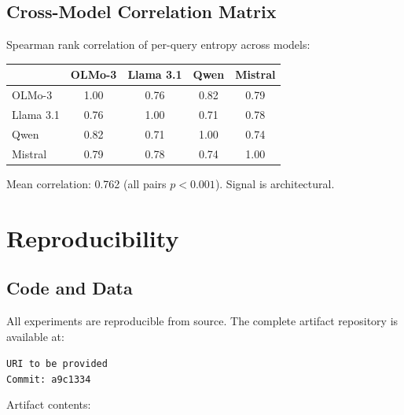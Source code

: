 \documentclass[12pt]{article}
\begin{document}
\subsection{Cross-Model Correlation Matrix}

Spearman rank correlation of per-query entropy across models:

\begin{table}[H]
\centering
\begin{tabular}{lcccc}
\toprule
& OLMo-3 & Llama 3.1 & Qwen & Mistral \\
\midrule
OLMo-3 & 1.00 & 0.76 & 0.82 & 0.79 \\
Llama 3.1 & 0.76 & 1.00 & 0.71 & 0.78 \\
Qwen & 0.82 & 0.71 & 1.00 & 0.74 \\
Mistral & 0.79 & 0.78 & 0.74 & 1.00 \\
\bottomrule
\end{tabular}
\end{table}

Mean correlation: 0.762 (all pairs $p < 0.001$). Signal is architectural.


\section{Reproducibility}

\subsection{Code and Data}

All experiments are reproducible from source. The complete artifact repository is available at:

\begin{center}
\texttt{URI to be provided}\\
\texttt{Commit: a9c1334}
\end{center}

\noindent Artifact contents:
\end{document}
